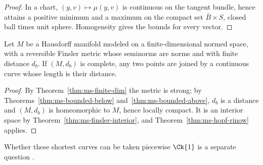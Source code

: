 \begin{proof}
  \leanok
  In a chart, $(y, v) \mapsto \mu(y, v)$ is continuous on the tangent bundle, hence attains a
  positive minimum and a maximum on the compact set $\bar B \times S$, closed ball times unit
  sphere. Homogeneity gives the bounds for every vector.
\end{proof}

\begin{corollary}
  \label{cor:ms-finsler-hopf-rinow}
  \leanok
  Let $M$ be a Hausdorff manifold modeled on a finite-dimensional normed space, with a reversible
  Finsler metric whose seminorms are norms and with finite distance $d_b$. If $(M, d_b)$ is
  complete, any two points are joined by a continuous curve whose length is their distance.
\end{corollary}

\begin{proof}
  \leanok
  By Theorem~\ref{thm:ms-finite-dim} the metric is strong; by Theorems~\ref{thm:ms-bounded-below}
  and~\ref{thm:ms-bounded-above}, $d_b$ is a distance and $(M, d_b)$ is homeomorphic to $M$, hence
  locally compact. It is an interior space by Theorem~\ref{thm:ms-finsler-interior}, and
  Theorem~\ref{thm:ms-hopf-rinow} applies.
\end{proof}

Whether these shortest curves can be taken piecewise $\Ck{1}$ is a separate question
\cite[Obs.~9.1.11]{Lar26}.
